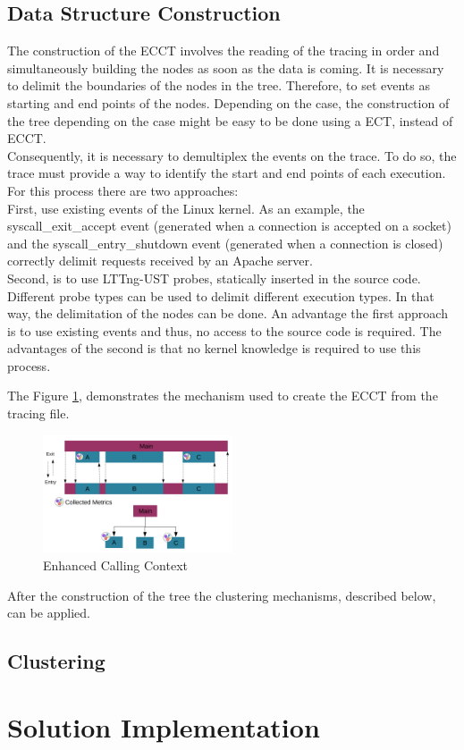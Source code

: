 \subsection{Data Structure Construction}
    The construction of the ECCT involves the reading of the tracing in order and simultaneously building the nodes as soon as the data is coming. It is necessary to delimit the boundaries of the nodes in the tree. Therefore, to set events as starting and end points of the nodes. Depending on the case, the construction of the tree depending on the case might be easy to be done using a ECT, instead of ECCT.\\
    Consequently, it is necessary to demultiplex the events on the trace. To do so, the trace must provide a way to identify the start and end points of each execution. 
    For this process there are two approaches:\\
    First, use existing events of the Linux kernel. As an example, the syscall\_exit\_accept event (generated when a connection is accepted on a socket) and the syscall\_entry\_shutdown event (generated when a connection is closed) correctly delimit requests received by an Apache server. \\
    Second, is to use LTTng-UST probes, statically inserted in the source code. Different probe types can be used to delimit different execution types. In that way, the delimitation of the nodes can be done.
    An advantage the first approach is to use existing events and thus, no access to the source code is required. The advantages of the second is that no kernel knowledge is required to use this process.
    
    The Figure \ref{fig:ecct_build}, demonstrates the mechanism used to create the ECCT from the tracing file.
    
\begin{figure}[h]
      \centering
        \includegraphics[width=0.50\textwidth]{figures/ecct.png}
        \caption{Enhanced Calling Context}
        \label{fig:ecct_build}
    \end{figure}
    
    After the construction of the tree the clustering mechanisms, described below, can be applied.\\
  
\subsection{Clustering}
\label{sec:clustering}
    
    
\section{Solution Implementation}
\label{sec:implementaion}
    
    
